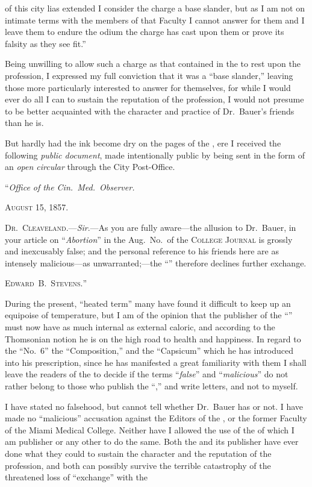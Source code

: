of this city lias extended I consider the charge a base slander, but as I
am not on intimate terms with the members of that Faculty I cannot
answer for them and I leave them to endure the odium the charge has
cast upon them or prove its falsity as they see fit.''

Being unwilling to allow such a charge as that contained in the
 to rest upon the profession, I expressed my full conviction
that it was a ``base slander,'' leaving those more particularly interested
to answer for themselves, for while I would ever do all I can to sustain
the reputation of the profession, I would not presume to be better
acquainted with the character and practice of Dr.~Bauer's friends
than he is.

But hardly had the ink become dry on the pages of the , ere
I received the following \emph{public document}, made intentionally public by
being sent in the form of an \emph{open circular} through the City Post-Office.

\hfill{}``\emph{Office of the Cin.\ Med.\ Observer.}\quad

\hfill{}\textsc{August 15, 1857.}\quad

\textsc{Dr.~Cleaveland}.---\emph{Sir}.---As you are fully aware---the allusion to
Dr.~Bauer, in your article on ``\emph{Abortion}'' in the Aug.\ No.\ of the
\textsc{College Journal} is grossly and inexcusably false; and the personal
reference to his friends here are as intensely malicious---as unwarranted;---the
``'' therefore declines further exchange.

\hfill{}\textsc{Edward~B.~Stevens.}''\quad

During the present, ``heated term'' many have found it difficult to
keep up an equipoise of temperature, but I am of the opinion that the
publisher of the ``'' must now have as much internal as
external caloric, and according to the Thomsonian notion he is on
the high road to health and happiness. In regard to the ``No.~6'' the
``Composition,'' and the ``Capsicum'' which he has introduced into
his prescription, since he has manifested a great familiarity with them
I shall leave the readers of the  to decide if the terms ``\emph{false}''
and ``\emph{malicious}'' do not rather belong to those who publish the ``,''
and write letters, and not to myself.

I have stated no falsehood, but cannot tell whether Dr.~Bauer has
or not. I have made no ``malicious'' accusation against the Editors of
the , or the former Faculty of the Miami Medical College.
Neither have I allowed the use of the  of which I am publisher
or any other to do the same. Both the  and
its publisher have ever done what they could to sustain the character
and the reputation of the profession, and both can possibly survive
the terrible catastrophy of the threatened loss of ``exchange'' with the\endinput
